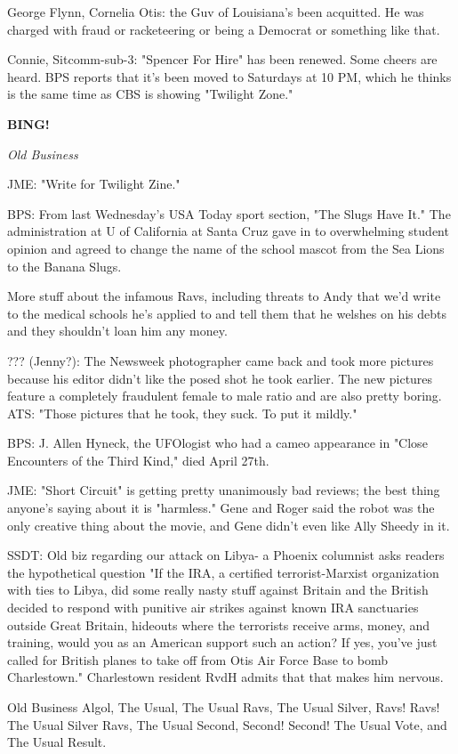 \documentclass[12pt]{article}
\newcommand{\bing}{{\bf BING!} }
\newcommand{\goto}[1]{\bing \vskip 12pt \centerline{{\em{#1}}}}
\begin{document}
George Flynn, Cornelia Otis: the Guv of Louisiana's been acquitted. He was charged with fraud or racketeering or being a Democrat or something like that.

Connie, Sitcomm-sub-3: "Spencer For Hire" has been renewed. Some cheers are heard. BPS reports that it's been moved to Saturdays at 10 PM, which he thinks is the same time as CBS is showing "Twilight Zone."

\goto{Old Business}

JME: "Write for Twilight Zine."

BPS: From last Wednesday's USA Today sport section, "The Slugs Have It." The administration at U of California at Santa Cruz gave in to overwhelming student opinion and agreed to change the name of the school mascot from the Sea Lions to the Banana Slugs.

More stuff about the infamous Ravs, including threats to Andy that we'd write to the medical schools he's applied to and tell them that he welshes on his debts and they shouldn't loan him any money.

??? (Jenny?): The Newsweek photographer came back and took more pictures because his editor didn't like the posed shot he took earlier. The new pictures feature a completely fraudulent female to male ratio and are also pretty boring. ATS: "Those pictures that he took, they suck. To put it mildly."

BPS: J. Allen Hyneck, the UFOlogist who had a cameo appearance in "Close Encounters of the Third Kind," died April 27th.

JME: "Short Circuit" is getting pretty unanimously bad reviews; the best thing anyone's saying about it is "harmless." Gene and Roger said the robot was the only creative thing about the movie, and Gene didn't even like Ally Sheedy in it.

SSDT: Old biz regarding our attack on Libya- a Phoenix columnist asks readers the hypothetical question "If the IRA, a certified terrorist-Marxist organization with ties to Libya, did some really nasty stuff against Britain and the British decided to respond with punitive air strikes against known IRA sanctuaries outside Great Britain, hideouts where the terrorists receive arms, money, and training, would you as an American support such an action? If yes, you've just called for British planes to take off from Otis Air Force Base to bomb Charlestown." Charlestown resident RvdH admits that that makes him nervous.

Old Business Algol, The Usual, The Usual Ravs, The Usual Silver, Ravs! Ravs! The Usual Silver Ravs, The Usual Second, Second! Second! The Usual Vote, and The Usual Result.
\end{document}
